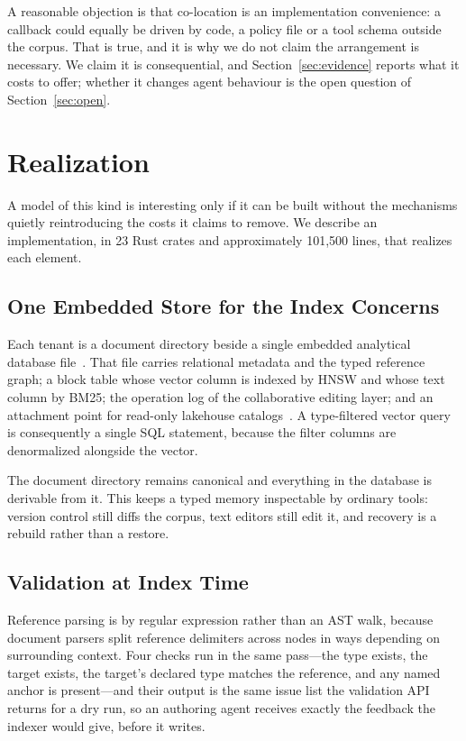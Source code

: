 \documentclass[journal,nofonttune]{IEEEtran}
\begin{document}
A reasonable objection is that co-location is an implementation convenience:
a callback could equally be driven by code, a policy file or a tool schema
outside the corpus. That is true, and it is why we do not claim the
arrangement is necessary. We claim it is consequential, and
Section~\ref{sec:evidence} reports what it costs to offer; whether it changes
agent behaviour is the open question of Section~\ref{sec:open}.

\section{Realization}
\label{sec:realization}

A model of this kind is interesting only if it can be built without the
mechanisms quietly reintroducing the costs it claims to remove. We describe
an implementation, in 23 Rust crates and approximately 101{,}500 lines, that
realizes each element.

\subsection{One Embedded Store for the Index Concerns}
Each tenant is a document directory beside a single embedded analytical
database file~\cite{duckdb}. That file carries relational metadata and the
typed reference graph; a block table whose vector column is indexed by HNSW
and whose text column by BM25; the operation log of the collaborative editing
layer; and an attachment point for read-only lakehouse
catalogs~\cite{ducklake}. A type-filtered vector query is consequently a
single SQL statement, because the filter columns are denormalized alongside
the vector.

The document directory remains canonical and everything in the database is
derivable from it. This keeps a typed memory inspectable by ordinary tools:
version control still diffs the corpus, text editors still edit it, and
recovery is a rebuild rather than a restore.

\subsection{Validation at Index Time}
Reference parsing is by regular expression rather than an AST walk, because
document parsers split reference delimiters across nodes in ways depending on
surrounding context. Four checks run in the same pass---the type exists, the
target exists, the target's declared type matches the reference, and any
named anchor is present---and their output is the same issue list the
validation API returns for a dry run, so an authoring agent receives exactly
the feedback the indexer would give, before it writes.
\end{document}
